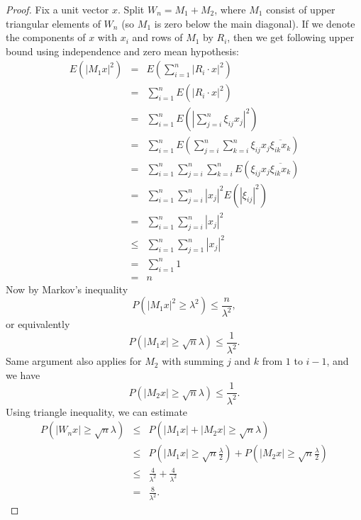 \documentclass[12pt,a4paper,leqno]{report}
\theoremstyle{plain}
\theoremstyle{definition}
\theoremstyle{remark}
\begin{document}
\begin{proof}
Fix a unit vector $x$. Split $W_n = M_1 + M_2$, where $M_1$ consist of upper triangular elements of $W_n$ (so $M_1$ is zero below the main diagonal).
If we denote the components of $x$ with $x_i$ and rows of $M_1$ by $R_i$, then we get following upper bound using independence and zero mean hypothesis:
\begin{eqnarray*}
E(|M_1x|^2) & = &  
E(\sum_{i=1}^n |R_i \cdot x|^2) \\
& = & \sum_{i=1}^n E(|R_i \cdot x|^2)\\
& = & \sum_{i=1}^n 
E(|\sum_{j=i}^n \xi_{ij} x_j|^2)\\
& = & \sum_{i=1}^n 
E(\sum_{j=i}^n \sum_{k=i}^n \xi_{ij} x_j\overline{\xi_{ik} x_k}) \\
& = & \sum_{i=1}^n 
\sum_{j=i}^n \sum_{k=i}^n E(\xi_{ij} x_j\overline{\xi_{ik} x_k}) \\
& = & \sum_{i=1}^n 
\sum_{j=i}^n |x_j|^2E(|\xi_{ij}|^2)\\
& = & \sum_{i=1}^n \sum_{j=i}^n |x_j|^2\\
& \leq & \sum_{i=1}^n \sum_{j=1}^n |x_j|^2\\
& = & \sum_{i=1}^n 1\\
& = & n
\end{eqnarray*}
Now by Markov's inequality 
\begin{equation*}
P(|M_1x|^2 \geq \lambda^2) \leq  \frac{n}{\lambda^2},
\end{equation*}
or equivalently
\begin{equation*}
P(|M_1x| \geq \sqrt{n} \lambda) \leq  \frac{1}{\lambda^2}.
\end{equation*}
Same argument also applies for $M_2$ with summing $j$ and $k$ from $1$ to $i-1$, and we have
\begin{equation*}
P(|M_2x| \geq \sqrt{n} \lambda) \leq  \frac{1}{\lambda^2}. 
\end{equation*}
Using triangle inequality, we can estimate
\begin{eqnarray*}
P(|W_nx| \geq \sqrt{n} \lambda) & \leq & P(|M_1x|+|M_2x| \geq \sqrt{n} \lambda)\\
& \leq & P(|M_1x| \geq \sqrt{n} \frac{\lambda}{2}) + P(|M_2x| \geq \sqrt{n} \frac{\lambda}{2})\\
& \leq & \frac{4}{\lambda^2} + \frac{4}{\lambda^2}\\
& = & \frac{8}{\lambda^2}.
\end{eqnarray*}
\end{proof} 
\end{document}
